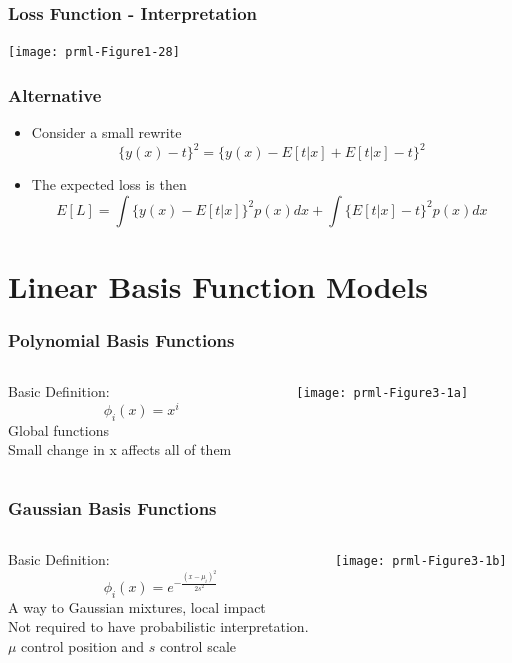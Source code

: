 \documentclass[10pt]{beamer}
\begin{document}
\begin{frame}
  \frametitle{Loss Function - Interpretation}
  \begin{center}
    \texttt{[image: prml-Figure1-28]}
  \end{center}
\end{frame}

\begin{frame}
  \frametitle{Alternative}
  \begin{itemize}
  \item Consider a small rewrite
    \[
    \{y(x) - t\}^2 = \{ y(x) - E[t|x] + E[t|x] - t \}^2
    \]
  \item The expected loss is then
    \[
    E[L] = \int \{ y(x) - E[t|x]\}^2 p(x) dx +
           \int \{ E[t|x] - t\}^2 p(x) dx
    \]
  \end{itemize}
\end{frame}

\section[Linear Models]{Linear Basis Function Models}

\begin{frame}
  \frametitle{Polynomial Basis Functions}
  \begin{columns}
    \begin{column}{5cm}
      Basic Definition:
      \[
      \phi_i(x) = x^i
      \]
      Global functions\\
      Small change in x affects all of them
    \end{column}
    \begin{column}{5cm}
      \texttt{[image: prml-Figure3-1a]}
    \end{column}
  \end{columns}
\end{frame}

\begin{frame}
  \frametitle{Gaussian Basis Functions}
  \begin{columns}
    \begin{column}{5cm}
      Basic Definition:
      \[
      \phi_i(x) = e^{- \frac{(x-\mu_i)^2}{2s^2}}
      \]
      A way to Gaussian mixtures, local impact\\
      Not required to have probabilistic interpretation.\\
      $\mu$ control position and $s$ control scale
    \end{column}
    \begin{column}{5cm}
      \texttt{[image: prml-Figure3-1b]}
    \end{column}
  \end{columns}
\end{frame}
\end{document}
